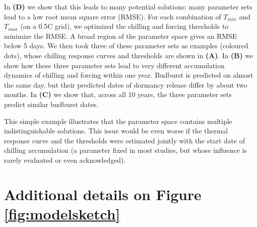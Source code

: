\documentclass[11pt]{article}
\begin{document}
In \textbf{(D)} we show that this leads to many potential solutions: many parameter sets lead to a low root mean square error (RMSE). For each combination of $T_{min}$ and $T_{max}$ (on a 0.5\degree C grid), we optimized the chilling and forcing thresholds to minimize the RMSE. A broad region of the parameter space gives an RMSE below 5 days. We then took three of these parameter sets as examples (coloured dots), whose chilling response curves and thresholds are shown in \textbf{(A)}. In \textbf{(B)} we show how these three parameter sets lead to very different accumulation dynamics of chilling and forcing within one year. Budburst is predicted on almost the same day, but their predicted dates of dormancy release differ by about two months. In \textbf{(C)} we show that, across all 10 years, the three parameter sets predict similar budburst dates.

This simple example illustrates that the parameter space contains multiple indistinguishable solutions. This issue would be even worse if the thermal response curve and the thresholds were estimated jointly with the start date of chilling accumulation (a parameter fixed in most studies, but whose influence is rarely evaluated or even acknowledged).



\section*{Additional details on Figure  \ref{fig:modelsketch}} 
\end{document}
